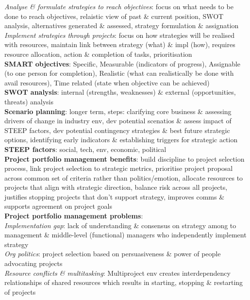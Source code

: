 \documentclass[a4paper]{article}
\begin{document}
\begin{multicols}{2}
        \textit{Analyse \& formulate strategies to reach objectives}: focus on what needs to be done to reach objectives, relaistic view of past \& current position, SWOT analysis, alternatives generated \& assessed, strategy formulation \& assignation\\
        \textit{Implement strategies through projects}: focus on how strategies will be realised with resources, maintain link between strategy (what) \& impl (how), requires resource allocation, action \& completion of tasks, prioritisation\\
        \textbf{SMART objectives}: Specific, Measurable (indicators of progress), Assignable (to one person for completion), Realistic (what can realistically be done with avail resources), Time related (state when objective can be achieved)\\
        \textbf{SWOT analysis}: internal (strengths, weaknesses) \& external (opportunities, threats) analysis\\
        \textbf{Scenario planning}: longer term, steps: clarifying core business \& assessing drivers of change in industry env, dev potential scenatios \& assess impact of STEEP factors, dev potential contingency strategies \& best future strategic options, identifying early indicators \& establishing triggers for strategic action\\
        \textbf{STEEP factors}: social, tech, env, economic, political\\
        \textbf{Project portfolio management benefits}: build discipline to project selection process, link project selection to strategic metrics, prioritise project proposal across common set of criteria rather than politics/emotion, allocate resources to projects that align with strategic direction, balance risk across all projects, justifies stopping projects that don't support strategy, improves comms \& supports agreement on project goals\\
        \textbf{Project portfolio management problems}:\\
        \textit{Implementation gap}: lack of understanding \& consensus on strategy among to management \& middle-level (functional) managers who independently implement strategy\\
        \textit{Org politics}: project selection based on persuasiveness \& power of people advocating projects\\
        \textit{Resource conflicts \& multitasking}: Multiproject env creates interdependency relationships of shared resources which results in starting, stopping \& restarting of projects\\

\end{multicols}
\end{document}
